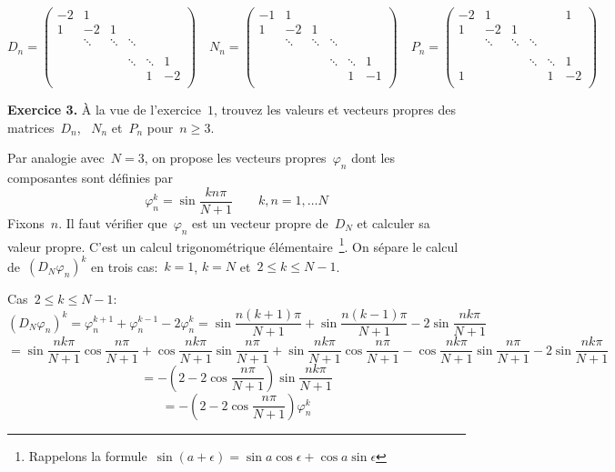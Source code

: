 \[
	D_n=\left(\begin{smallmatrix}
		-2 & 1 &   & &  \\
		1 & -2 & 1 & &  \\
		& \ddots & \ddots & \ddots & \\
		& &  & &  & \\
		& & &\ddots &\ddots & 1\\
		& & & &1 &-2 \\
	\end{smallmatrix}\right)
	\quad
	N_n=\left(\begin{smallmatrix}
		-1 & 1 &   & &  \\
		1 & -2 & 1 & &  \\
		& \ddots & \ddots & \ddots & \\
		& &  & &  & \\
		& & &\ddots &\ddots & 1\\
		& & & &1 &-1 \\
	\end{smallmatrix}\right)
	\quad
	P_n=\left(\begin{smallmatrix}
		-2 & 1 &  & & &1  \\
		1 & -2 & 1 & &  \\
		& \ddots & \ddots & \ddots & \\
		& &  & &  & \\
		& & &\ddots &\ddots & 1\\
		1& & & &1 &-2 \\
	\end{smallmatrix}\right)
\]

\clearpage
{\color{blue}
{\bf Exercice 3.}
À la vue de l'exercice~$1$, trouvez les valeurs et vecteurs propres des
matrices~$D_n$, ~$N_n$ et~$P_n$ pour~$n\ge 3$.
}

Par analogie avec~$N=3$, on propose les vecteurs propres~$\varphi_n$
dont les composantes sont définies par
\[
	\varphi_n^k = \sin\frac{kn\pi}{N+1}
	\qquad
	k,n=1,\ldots N
\]
Fixons~$n$.
Il faut vérifier que~$\varphi_n$ est un vecteur propre de~$D_N$ et calculer
sa valeur propre.  C'est un calcul trigonométrique élémentaire~\footnote{Rappelons
	la 
formule~$\sin(a+\epsilon)=\sin a\cos\epsilon+\cos a\sin\epsilon$}.  On sépare le
calcul de~$(D_N\varphi_n)^k$ en
trois cas:~$k=1$, $k=N$ et~$2\le k\le N-1$.


Cas~$2\le k\le N-1$:
\[
	(D_N\varphi_n)^k = \varphi_n^{k+1}+\varphi_n^{k-1}-2\varphi_n^k
	=
	\sin\frac{n(k+1)\pi}{N+1}
	+
	\sin\frac{n(k-1)\pi}{N+1}
	-2\sin\frac{nk\pi}{N+1}
\]
{\small
\[
	=
	\sin\frac{nk\pi}{N\!\!+\!\!1}\cos\frac{n\pi}{N\!\!+\!\!1}
	+
	\cos\frac{nk\pi}{N\!\!+\!\!1}\sin\frac{n\pi}{N\!\!+\!\!1}
	+
	\sin\frac{nk\pi}{N\!\!+\!\!1}\cos\frac{n\pi}{N\!\!+\!\!1}
	-
	\cos\frac{nk\pi}{N\!\!+\!\!1}\sin\frac{n\pi}{N\!\!+\!\!1}
	-2\sin\frac{nk\pi}{N\!\!+\!\!1}
\]
}
\[
	=-\left(2-2\cos\frac{n\pi}{N+1}\right)\sin\frac{nk\pi}{N+1}
\]
\[
	=-\left(2-2\cos\frac{n\pi}{N+1}\right)\varphi_n^k
\]

